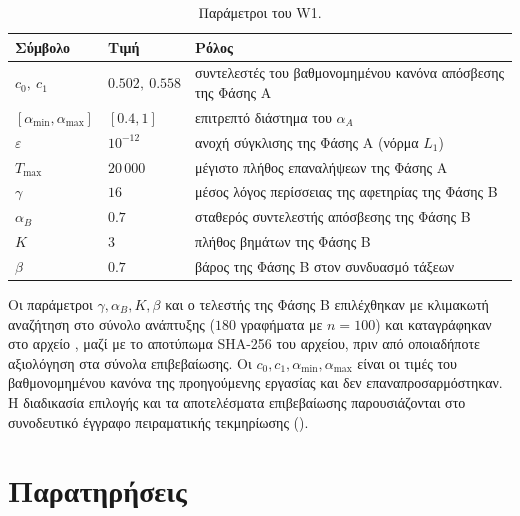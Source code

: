 \documentclass[11pt,a4paper]{article}
\newcommand{\Czero}{0.502}
\newcommand{\Cone}{0.558}
\newcommand{\Amin}{0.4}
\newcommand{\Amax}{1}
\newcommand{\Tol}{10^{-12}}
\newcommand{\Tmax}{20\,000}
\newcommand{\Gam}{16}
\newcommand{\AB}{0.7}
\newcommand{\KB}{3}
\newcommand{\Beta}{0.7}
\begin{document}
\begin{table}[H]
\centering
\caption{Παράμετροι του W1.}\label{tab:params}
\small
\begin{tabular}{@{}l l l@{}}
\toprule
Σύμβολο & Τιμή & Ρόλος \\
\midrule
$c_0,\ c_1$ & $\Czero,\ \Cone$ & συντελεστές του βαθμονομημένου κανόνα απόσβεσης της Φάσης Α \\
$[\alpha_{\min},\alpha_{\max}]$ & $[\Amin,\Amax]$ & επιτρεπτό διάστημα του $\alpha_A$ \\
$\varepsilon$ & $\Tol$ & ανοχή σύγκλισης της Φάσης Α (νόρμα $L_1$) \\
$T_{\max}$ & $\Tmax$ & μέγιστο πλήθος επαναλήψεων της Φάσης Α \\
$\gamma$ & $\Gam$ & μέσος λόγος περίσσειας της αφετηρίας της Φάσης Β \\
$\alpha_B$ & $\AB$ & σταθερός συντελεστής απόσβεσης της Φάσης Β \\
$K$ & $\KB$ & πλήθος βημάτων της Φάσης Β \\
$\beta$ & $\Beta$ & βάρος της Φάσης Β στον συνδυασμό τάξεων \\
\bottomrule
\end{tabular}
\end{table}

Οι παράμετροι $\gamma,\alpha_B,K,\beta$ και ο τελεστής της Φάσης Β επιλέχθηκαν με κλιμακωτή αναζήτηση στο σύνολο ανάπτυξης ($180$ γραφήματα με $n=100$) και καταγράφηκαν στο αρχείο , μαζί με το αποτύπωμα SHA-256 του αρχείου, πριν από οποιαδήποτε αξιολόγηση στα σύνολα επιβεβαίωσης. Οι $c_0,c_1,\alpha_{\min},\alpha_{\max}$ είναι οι τιμές του βαθμονομημένου κανόνα της προηγούμενης εργασίας και δεν επαναπροσαρμόστηκαν. Η διαδικασία επιλογής και τα αποτελέσματα επιβεβαίωσης παρουσιάζονται στο συνοδευτικό έγγραφο πειραματικής τεκμηρίωσης ().

\section{Παρατηρήσεις}
\end{document}
